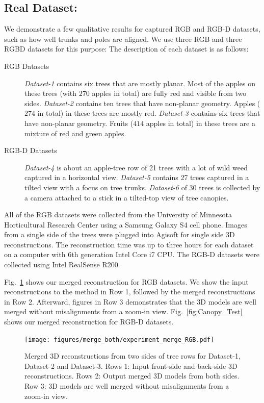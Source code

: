 \subsection{Real Dataset:}
We demonstrate a few qualitative results for captured RGB and RGB-D datasets, such as how well trunks and poles are aligned. We use three RGB and three RGBD datasets for this purpose: The description of each dataset is as follows:
\begin{description}
    \item[RGB Datasets] \emph{Dataset-1} contains six trees that are mostly planar. Most of the apples on these trees (with $270$ apples in total) are fully red and visible from two sides. \emph{Dataset-2} contains ten trees that have non-planar geometry. Apples ($274$ in total) in these trees are mostly red. \emph{Dataset-3} contains six trees that have non-planar geometry. Fruits ($414$ apples in total) in these trees are a mixture of red and green apples.
    \item[RGB-D Datasets] \emph{Dataset-4} is about an apple-tree row of 21 trees with a lot of wild weed captured in a horizontal view. \emph{Dataset-5} contains 27 trees captured in a tilted view with a focus on tree trunks. \emph{Dataset-6} of 30 trees is collected by a camera attached to a stick in a tilted-top view of tree canopies.

\end{description}
All of the RGB datasets were collected from the University of Minnesota Horticultural Research Center using a Samsung Galaxy S4 cell phone. Images from a single side of the trees were plugged into Agisoft for single side 3D reconstructions. The reconstruction time was up to three hours for each dataset on a computer with 6th generation Intel Core i7 CPU. The RGB-D datasets were collected using Intel RealSense R200.



 Fig.~\ref{fig:dataset2_recons} shows our merged reconstruction for RGB datasets. We show the input reconstructions to the method in Row 1, followed by the merged reconstructions in Row 2. Afterward, figures in Row 3 demonstrates that the 3D models are well merged without misalignments from a zoom-in view. Fig.~\ref{fig:Canopy_Test} shows our merged reconstruction for RGB-D datasets. 
\begin{figure}[!hbt]
    \centering
    \texttt{[image: figures/merge\_both/experiment\_merge\_RGB.pdf]}
    \caption[Merged 3D reconstructions for RGB datasets.]{Merged 3D reconstructions from two sides of tree rows for Dataset-1, Dataset-2 and Dataset-3. Rows 1: Input front-side and back-side 3D reconstructions. Rows 2: Output merged 3D models from both sides. Row 3: 3D models are well merged without misalignments from a zoom-in view.}
    \label{fig:dataset2_recons}
\end{figure}


